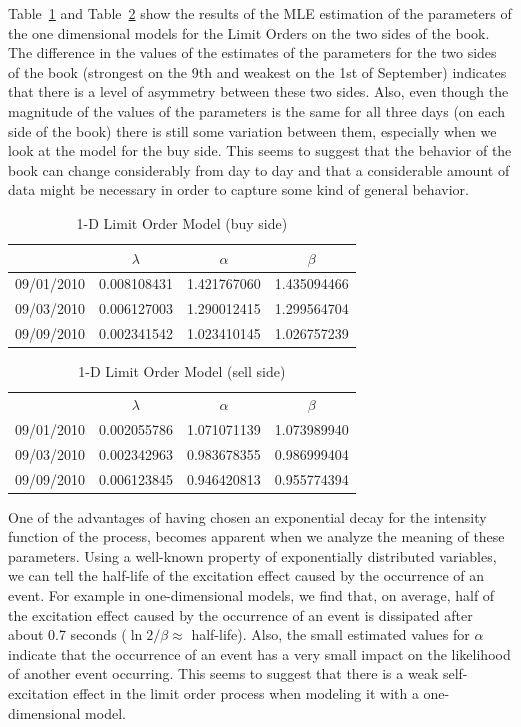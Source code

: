 Table~\ref{tab:limmodbuy} and Table~\ref{tab:limmodsell} show the results of the MLE estimation of the parameters of the one dimensional models for the Limit Orders on the two sides of the book. The difference in the values of the estimates of the parameters for the two sides of the book (strongest on the 9th and weakest on the 1st of September) indicates that there is a level of asymmetry between these two sides. Also, even though the magnitude of the values of the parameters is the same for all three days (on each side of the book) there is still some variation between them, especially when we look at the model for the buy side. This seems to suggest that the behavior of the book can change considerably from day to day and that a considerable amount of data might be necessary in order to capture some kind of general behavior. 
	\begin{table}
	\centering
	\caption{1-D Limit Order Model (buy side) \label{tab:limmodbuy}}
	\begin{tabular}{c|ccc} 
		& $\lambda$ & $\alpha$  & $\beta$ \\ \hline
	09/01/2010 & 0.008108431 & 1.421767060 & 1.435094466 \\
	09/03/2010 & 0.006127003 & 1.290012415 & 1.299564704 \\
	09/09/2010 & 0.002341542 & 1.023410145 & 1.026757239
	\end{tabular}
	\end{table}
	\begin{table}
	\centering
	\caption{1-D Limit Order Model (sell side) \label{tab:limmodsell}}
	\begin{tabular}{c|ccc} 
		& $\lambda$ & $\alpha$ & $\beta$ \\
	09/01/2010 & 0.002055786 & 1.071071139 & 1.073989940 \\
	09/03/2010 & 0.002342963 & 0.983678355 & 0.986999404 \\
	09/09/2010 & 0.006123845 & 0.946420813 & 0.955774394
	\end{tabular}
	\end{table}


One of the advantages of having chosen an exponential decay for the intensity function of the process, becomes apparent when we analyze the meaning of these parameters. Using a well-known property of exponentially distributed variables, we can tell the half-life of the excitation effect caused by the occurrence of an event. For example in one-dimensional models, we find that, on average, half of the excitation effect caused by the occurrence of an event is dissipated after about 0.7 seconds ($\ln 2/\beta \approx$ half-life). Also, the small estimated values for $\alpha$ indicate that the occurrence of an event has a very small impact on the likelihood of another event occurring. This seems to suggest that there is a weak self-excitation effect in the limit order process when modeling it with a one-dimensional model. 


